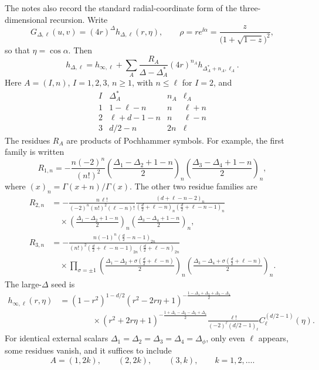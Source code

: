 The notes also record the standard radial-coordinate form of the
three-dimensional recursion.  Write
\[
  G_{\Delta,\ell}(u,v)=(4r)^\Delta h_{\Delta,\ell}(r,\eta),
  \qquad
  \rho=re^{\ii\alpha}
  =
  \frac{z}{\bigl(1+\sqrt{1-z}\bigr)^2},
\]
so that \(\eta=\cos\alpha\).  Then
\[
  h_{\Delta,\ell}
  =
  h_{\infty,\ell}
  +
  \sum_A
  \frac{R_A}{\Delta-\Delta_A^*}
  (4r)^{n_A}h_{\Delta_A^*+n_A,\ell_A}.
\]
Here \(A=(I,n)\), \(I=1,2,3\), \(n\ge1\), with \(n\le\ell\) for
\(I=2\), and
\[
\begin{array}{c|c|c|c}
I & \Delta_A^* & n_A & \ell_A\\ \hline
1 & 1-\ell-n & n & \ell+n\\
2 & \ell+d-1-n & n & \ell-n\\
3 & d/2-n & 2n & \ell
\end{array}
\]
The residues \(R_A\) are products of Pochhammer symbols.  For example,
the first family is written
\[
  R_{1,n}
  =
  -\frac{n(-2)^n}{(n!)^2}
  \left(\frac{\Delta_1-\Delta_2+1-n}{2}\right)_n
  \left(\frac{\Delta_3-\Delta_4+1-n}{2}\right)_n,
\]
where \((x)_n=\Gamma(x+n)/\Gamma(x)\).  The other two residue families
are
\[
\begin{aligned}
  R_{2,n}
  &=
  -\frac{n\,\ell!}{(-2)^n(n!)^2(\ell-n)!}
  \frac{(d+\ell-n-2)_n}
       {\left(\frac d2+\ell-n\right)_n
        \left(\frac d2+\ell-n-1\right)_n} \\
  &\quad\times
  \left(\frac{\Delta_1-\Delta_2+1-n}{2}\right)_n
  \left(\frac{\Delta_3-\Delta_4+1-n}{2}\right)_n ,
  \\
  R_{3,n}
  &=
  -\frac{n(-1)^n\left(\frac d2-n-1\right)_{2n}}
        {(n!)^2
        \left(\frac d2+\ell-n-1\right)_{2n}
        \left(\frac d2+\ell-n\right)_{2n}} \\
  &\quad\times
  \prod_{\sigma=\pm1}
  \left(\frac{\Delta_1-\Delta_2+\sigma(\frac d2+\ell-n)}{2}\right)_n
  \left(\frac{\Delta_3-\Delta_4+\sigma(\frac d2+\ell-n)}{2}\right)_n .
\end{aligned}
\]
The large-\(\Delta\) seed is
\[
\begin{aligned}
  h_{\infty,\ell}(r,\eta)
  &=
  (1-r^2)^{1-d/2}
  (r^2-2r\eta+1)^{-\frac{1-\Delta_1+\Delta_2+\Delta_3-\Delta_4}{2}} \\
  &\qquad\qquad\times
  (r^2+2r\eta+1)^{-\frac{1+\Delta_1-\Delta_2-\Delta_3+\Delta_4}{2}}
  \frac{\ell!}{(-2)^\ell(d/2-1)_\ell}
  C_\ell^{(d/2-1)}(\eta).
\end{aligned}
\]
For identical external scalars
\(\Delta_1=\Delta_2=\Delta_3=\Delta_4=\Delta_\phi\), only even
\(\ell\) appears, some residues vanish, and it suffices to include
\[
  A=(1,2k),\qquad (2,2k),\qquad (3,k),
  \qquad k=1,2,\ldots .
\]

